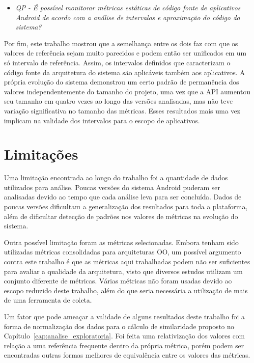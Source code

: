 \begin{itemize}
\item \textit{QP - É possível monitorar métricas estáticas de código fonte de aplicativos Android de acordo com a análise de intervalos e aproximação do código do sistema?}
\end{itemize}

Por fim, este trabalho mostrou que a semelhança entre os dois faz com que os valores de referência sejam muito parecidos e podem então ser unificados em um só intervalo de referência. Assim, os intervalos definidos que caracterizam o código fonte da arquitetura do sistema são aplicáveis também aos aplicativos. A própria evolução do sistema demonstrou um certo padrão de permanência dos valores independentemente do tamanho do projeto, uma vez que a API aumentou seu tamanho em quatro vezes ao longo das versões analisadas, mas não teve variação significativa no tamanho das métricas. Esses resultados mais uma vez implicam na validade dos intervalos para o escopo de aplicativos.

\section{Limitações}

Uma limitação encontrada ao longo do trabalho foi a quantidade de dados utilizados para análise. Poucas versões do sistema Android puderam ser analisadas devido ao tempo que cada análise leva para ser concluída. Dados de poucas versões dificultam a generalização dos resultados para toda a plataforma, além de dificultar detecção de padrões nos valores de métricas na evolução do sistema.

Outra possível limitação foram as métricas selecionadas. Embora tenham sido utilizadas métricas consolidadas para arquiteturas OO, um possível argumento contra este trabalho é que as métricas aqui trabalhadas podem não ser suficientes para avaliar a qualidade da arquitetura, visto que diversos estudos utilizam um conjunto diferente de métricas. Várias métricas não foram usadas devido ao escopo reduzido deste trabalho, além do que seria necessária a utilização de mais de uma ferramenta de coleta.

Um fator que pode ameaçar a validade de alguns resultados deste trabalho foi a forma de normalização dos dados para o cálculo de similaridade proposto no Capítulo~\ref{cap:analise_exploratoria}. Foi feita uma relativização dos valores com relação a uma referência frequente dentro da própria métrica, porém podem ser encontradas outras formas melhores de equivalência entre os valores das métricas.

